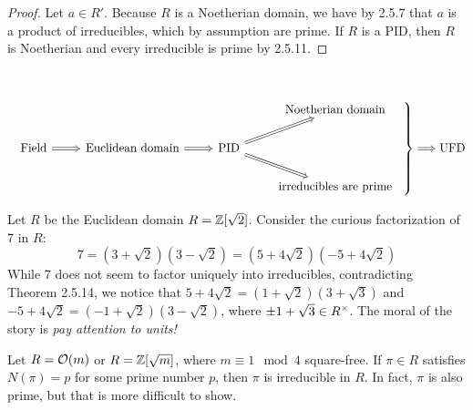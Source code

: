 \documentclass[11pt]{book}
\theoremstyle{definition}   \newtheorem{defn}[counter]{Definition} %
\newcommand{\vs}{\vspace{8pt}}
\numberwithin{counter}{chapter}
\begin{document}
\begin{proof}
Let $a \in R'$. Because $R$ is a Noetherian domain, we have by 2.5.7 that $a$ is a product of irreducibles, which by assumption are prime. If $R$ is a PID, then $R$ is Noetherian and every irreducible is prime by 2.5.11.
\end{proof}

\vs

\begin{remark} \ \\

\begin{center}
\[ \left. \begin{array}{c}
\begin{tikzcd}
& & & \tn{Noetherian domain} \\
\tn{Field} \arrow[r,Rightarrow] & \tn{Euclidean domain}
\arrow[Rightarrow]{r}{} & \tn{PID} \arrow[Rightarrow]{ur}{}
\arrow[Rightarrow]{dr}{} \\
& & & \tn{irreducibles are prime}
\end{tikzcd}
\end{array} \right\} \Longrightarrow \tn{UFD}
\]
\end{center}
\end{remark}

\vs

\begin{example}
Let $R$ be the Euclidean domain $R = \operatorname{\mathbb{Z}}[\sqrt{2}]$. Consider the curious factorization of 7 in $R$:
	\[7 = (3+\sqrt{2})(3-\sqrt{2}) = (5+4\sqrt{2})(-5+4\sqrt{2}) \tag{All factors are irreducible!}\]
While 7 does not seem to factor uniquely into irreducibles, contradicting Theorem 2.5.14, we notice that $5 + 4\sqrt{2} = (1+\sqrt{2})(3+\sqrt{3})$ and $-5+4\sqrt{2} = (-1+\sqrt{2})(3-\sqrt{2})$, where $\pm 1 + \sqrt{3} \in R^{\times}$. The moral of the story is \emph{pay attention to units!}
\end{example}

\vs

\noindent {} Let $R = \mathcal{O}(m)$ or $R = \operatorname{\mathbb{Z}}[\sqrt{m}]$, where $m \equiv 1 \mod{4}$ square-free. If $\pi \in R$ satisfies $N(\pi) = p$ for some prime number $p$, then $\pi$ is irreducible in $R$. In fact, $\pi$ is also prime, but that is more difficult to show.

\vs
\end{document}
